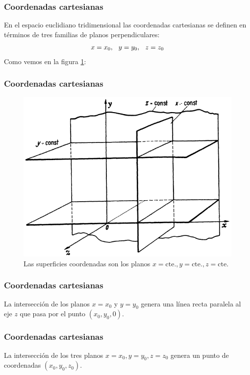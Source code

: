 \documentclass[12pt]{beamer}
\begin{document}
\begin{frame}
\frametitle{Coordenadas cartesianas}
En el espacio euclidiano tridimensional las coordenadas cartesianas se definen en términos de tres familias de planos perpendiculares: 
\begin{align*}
x = x_{0}, \hspace{0.25cm} y = y_{0}, \hspace{0.25cm} z = z_{0}
\end{align*}
\pause
Como vemos en la figura \ref{fig:figura_planos_cartesianos}:
\end{frame}
\begin{frame}
\frametitle{Coordenadas cartesianas}
\begin{figure}[h!]
   \centering
   \includegraphics[scale=1.3]{Imagenes/Planos_Coordenadas_Cartesianas.png}
   \caption{Las superficies coordenadas son los planos $x=\mbox{cte.}, y=\mbox{cte.}, z=\mbox{cte.}$}
   \label{fig:figura_planos_cartesianos}
\end{figure}
\end{frame}
\begin{frame}
\frametitle{Coordenadas cartesianas}
La intersección de los planos $x = x_{0}$ y $y = y_{0}$ genera una línea recta paralela al eje $z$
que pasa por el punto $(x_{0}, y_{0}, 0)$.
\end{frame}
\begin{frame}
\frametitle{Coordenadas cartesianas}
La intersección de los tres planos $x = x_{0}, y = y_{0}, z = z_{0}$ genera un punto de coordenadas $(x_{0}, y_{0}, z_{0})$.
\end{frame}
\end{document}
